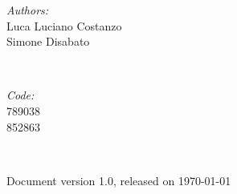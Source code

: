 \documentclass[12pt]{report}
\begin{document}
\begin{titlepage}
\begin{flushleft}
	\begin{minipage}{0.45\textwidth}
	\begin{flushleft} \large
	\emph{Authors:}\\
	Luca Luciano Costanzo\\
	Simone Disabato
	\end{flushleft}
	\end{minipage}
	~
	\begin{minipage}{0.45\textwidth}
	\begin{flushright} \large
	\emph{Code:} \\
	789038\\
	852863
	\end{flushright}
	\end{minipage} \\[1cm]

\end{flushleft} 

{\large Document version 1.0, released on \today} %


\vfill %

\end{titlepage}
\clearpage


\pagestyle{plain}

\tableofcontents %

\cleardoublepage

\setmyfancystyle
{}







\begin{appendix}
	
	
\end{appendix}
\end{document}
